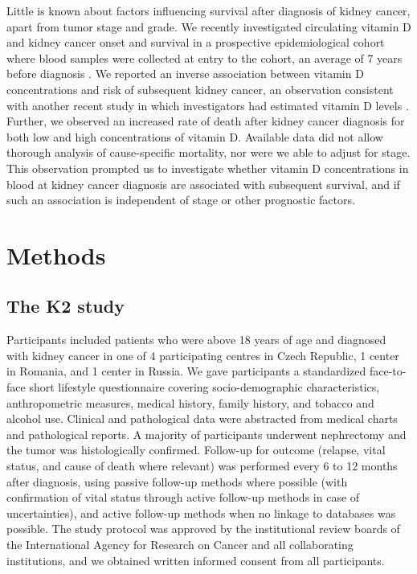\documentclass[a4paper,11pt]{article}
\renewcommand{\cite}{\citep}
\begin{document}
Little is known about factors influencing survival after diagnosis of kidney 
cancer, apart from tumor stage and grade. We recently investigated circulating 
vitamin D and kidney cancer onset and survival in a prospective epidemiological 
cohort where blood samples were collected at entry to the cohort, an average 
of 7 years before diagnosis \cite{muller_circulating_2014}. We reported an 
inverse association between vitamin D concentrations and risk of subsequent 
kidney cancer, an observation consistent with another recent study in which 
investigators had estimated vitamin D levels \cite{joh_predicted_2013}. 
Further, we observed an increased rate of death after kidney cancer diagnosis 
for both low and high concentrations of vitamin D. Available data did not allow 
thorough analysis of cause-specific mortality, nor were we able to adjust for 
stage. This observation prompted us to investigate whether vitamin D 
concentrations in blood at kidney cancer diagnosis are associated with 
subsequent survival, and if such an association is independent of stage or 
other prognostic factors.   

\section*{Methods}
\subsection*{The K2 study}
Participants included patients who were above 18 years of age and diagnosed 
with kidney cancer in one of 4 participating centres in Czech Republic, 1 
center in Romania, and 1 center in Russia. We gave 
participants a standardized face-to-face short lifestyle 
questionnaire covering socio-demographic characteristics, anthropometric 
measures, medical history, family history, and tobacco and alcohol use. 
Clinical and pathological data were abstracted from medical charts and 
pathological reports. A majority of participants underwent nephrectomy and the 
tumor was histologically confirmed. Follow-up for outcome (relapse, vital 
status, and cause of death where relevant) was performed every 6 to 12 months 
after diagnosis, using passive follow-up methods where possible (with 
confirmation of vital status through active follow-up methods in case of 
uncertainties), and active follow-up methods when no linkage to databases was 
possible. The study protocol was approved by the institutional review boards of the 
International Agency for Research on Cancer and all collaborating institutions, and 
we obtained written informed consent from all participants. 
\end{document}
